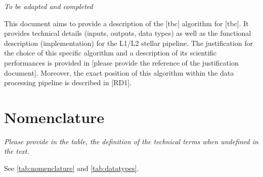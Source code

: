 \documentclass[a4paper, oneside, 11pt, article, english]{memoir}
\begin{document}
\emph{To be adapted and completed}

This document aims to provide a description of the [tbc] algorithm for [tbc]. It
provides technical details (inputs, outputs, data types) as well as the
functional description (implementation) for the L1/L2 stellar pipeline. The
justification for the choice of this specific algorithm and a description of its
scientific performances is provided in [please provide the reference of the
justification document]. Moreover, the exact position of this algorithm within
the data processing pipeline is described in [RD1].


\section{Nomenclature}
\label{sec:nomenclature}

\emph{Please provide in the table, the definition of the technical terms when
undefined in the text.}

See \cref{tab:nomenclature} and \cref{tab:datatypes}.
\end{document}
